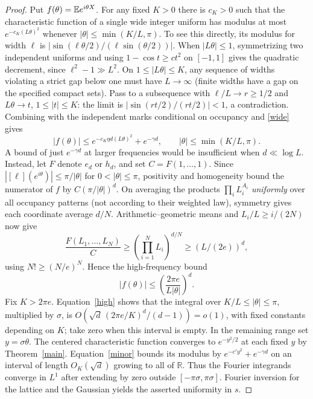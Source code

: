 \documentclass[11pt]{article}
\begin{document}
\begin{proof}
Put $f(\theta)=\mathbb E e^{i\theta X}$. For any fixed $K>0$ there is $c_K>0$ such that the characteristic function of a single wide integer uniform has modulus at most $e^{-c_K(L\theta)^2}$ whenever $|\theta|\le\min(K/L,\pi)$. To see this directly, its modulus for width $\ell$ is $|\sin(\ell\theta/2)/(\ell\sin(\theta/2))|$. When $|L\theta|\le1$, symmetrizing two independent uniforms and using $1-\cos t\ge c t^2$ on $[-1,1]$ gives the quadratic decrement, since $\ell^2-1\gg L^2$. On $1\le |L\theta|\le K$, any sequence of widths violating a strict gap below one must have $L\to\infty$ (finite widths have a gap on the specified compact sets). Pass to a subsequence with $\ell/L\to r\ge1/2$ and $L\theta\to t$, $1\le |t|\le K$: the limit is $|\sin(rt/2)/(rt/2)|<1$, a contradiction. Combining with the independent marks conditional on occupancy and \eqref{wide} gives
\begin{equation}
|f(\theta)|\le e^{-c_K\eta d (L\theta)^2}+e^{-\gamma d},
\qquad |\theta|\le\min(K/L,\pi). \label{minor}
\end{equation}
A bound of just $e^{-\gamma d}$ at larger frequencies would be insufficient when $d\ll\log L$. Instead, let $F$ denote $e_d$ or $h_d$, and set $C=F(1,\ldots,1)$. Since $|[\ell](e^{i\theta})|\le\pi/|\theta|$ for $0<|\theta|\le\pi$, positivity and homogeneity bound the numerator of $f$ by $C(\pi/|\theta|)^d$. On averaging the products $\prod_i L_i^{A_i}$ \emph{uniformly} over all occupancy patterns (not according to their weighted law), symmetry gives each coordinate average $d/N$. Arithmetic--geometric means and $L_i/L\ge i/(2N)$ now give
\[
\frac{F(L_1,\ldots,L_N)}{C}
\ge\left(\prod_{i=1}^N L_i\right)^{d/N}\ge (L/(2e))^d ,
\]
using $N!\ge(N/e)^N$. Hence the high-frequency bound
\begin{equation}
|f(\theta)|\le\left(\frac{2\pi e}{L|\theta|}\right)^d.\label{high}
\end{equation}
Fix $K>2\pi e$. Equation~\eqref{high} shows that the integral over $K/L\le|\theta|\le\pi$, multiplied by $\sigma$, is $O(\sqrt d\,(2\pi e/K)^d/(d-1))=o(1)$, with fixed constants depending on $K$; take zero when this interval is empty. In the remaining range set $y=\sigma\theta$. The centered characteristic function converges to $e^{-y^2/2}$ at each fixed $y$ by Theorem~\ref{main}. Equation~\eqref{minor} bounds its modulus by $e^{-c' y^2}+e^{-\gamma d}$ on an interval of length $O_K(\sqrt d)$ growing to all of $\mathbb R$. Thus the Fourier integrands converge in $L^1$ after extending by zero outside $[-\pi\sigma,\pi\sigma]$. Fourier inversion for the lattice and the Gaussian yields the asserted uniformity in $s$.
\end{proof}
\end{document}
